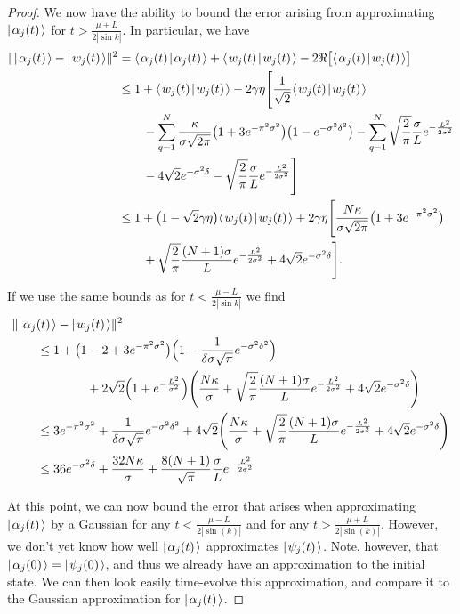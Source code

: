 \documentclass[../thesis-main/thesis-main]{subfiles}
\begin{document}
\begin{proof}
We now have the ability to bound the error arising from approximating $|\mspace{2mu} \alpha_j(t) \mspace{2mu} \rangle$ for $t > \frac{\mu + L}{2|\sin k|}$.  In particular, we have
\begin{align}
    \|{|\mspace{2mu} \alpha_j(t) \mspace{2mu} \rangle - |\mspace{2mu} w_j(t) \mspace{2mu} \rangle}\|^2 &= \langle\mspace{2mu} \alpha_j(t) \mspace{2mu} | \mspace{2mu} \alpha_j(t)\mspace{2mu} \rangle + \langle\mspace{2mu} w_j(t) \mspace{2mu} | \mspace{2mu} w_j(t)\mspace{2mu} \rangle - 2 \Re\big[ \langle\mspace{2mu} \alpha_j(t) \mspace{2mu} | \mspace{2mu} w_j(t)\mspace{2mu} \rangle \big]\\
  & \leq 1 + \langle\mspace{2mu} w_j(t) \mspace{2mu} | \mspace{2mu} w_j(t)\mspace{2mu} \rangle - 2\gamma \eta \Bigg[  \frac{1}{\sqrt{2}} \langle\mspace{2mu} w_j(t) \mspace{2mu} | \mspace{2mu} w_j(t)\mspace{2mu} \rangle \nonumber\\
  & \qquad  - \sum_{q=1}^N  \frac{\kappa}{\sigma \sqrt{2\pi}}\big(1 + 3 e^{-\pi^2 \sigma^2}\big)\big(1 - e^{-\sigma^2 \delta^2}\big) - \sum_{q=1}^N \sqrt{\frac{2}{\pi}} \frac{\sigma}{L} e^{-\frac{L^2}{2\sigma^2}}\nonumber\\
  &\qquad  - 4 \sqrt{2} e^{-\sigma^2 \delta} - \sqrt{\frac{2}{\pi}} \frac{\sigma}{L} e^{-\frac{L^2}{2\sigma^2}}\Bigg]\\
  &\leq 1 + \big(1 - \sqrt{2}\gamma \eta \big) \langle\mspace{2mu} w_j(t) \mspace{2mu} | \mspace{2mu} w_j(t)\mspace{2mu} \rangle + 2\gamma\eta \Bigg[ \frac{N \kappa}{\sigma \sqrt{2\pi}} \big(1 + 3 e^{-\pi^2 \sigma^2}\big) \nonumber\\
  &\qquad + \sqrt{\frac{2}{\pi}} \frac{(N+1)\sigma}{L} e^{ - \frac{L^2}{2\sigma^2}} + 4 \sqrt{2} e^{-\sigma^2\delta} \Bigg].
\end{align}
If we use the same bounds as for $t < \frac{\mu -L}{2|\sin k|}$ we find 
\begin{align}
  & \|{|\mspace{2mu} \alpha_j(t) \mspace{2mu} \rangle - |\mspace{2mu} w_j(t) \mspace{2mu} \rangle}\|^2 \\
  & \qquad \leq 1 + \big(1 - 2 + 3 e^{-\pi^2 \sigma^2}\big) \Big(1 - \frac{1}{\delta \sigma \sqrt{\pi}} e^{-\sigma^2 \delta^2} \Big) \nonumber\\
  &\qquad \qquad \qquad + 2\sqrt{2} \Big( 1 + e^{ - \frac{L^2}{\sigma^2}} \Big)\Bigg( \frac{N \kappa}{\sigma}  + \sqrt{\frac{2}{\pi}} \frac{(N+1)\sigma}{L} e^{-\frac{L^2}{2\sigma^2} }+ 4 \sqrt{2} e^{-\sigma^2 \delta}  \Bigg)\\
  & \qquad \leq 3 e^{-\pi^2 \sigma^2} + \frac{1}{\delta \sigma \sqrt{\pi}} e^{ - \sigma^2 \delta^2} + 4 \sqrt{2} \Bigg( \frac{N \kappa}{\sigma}  + \sqrt{\frac{2}{\pi}} \frac{(N+1)\sigma}{L} e^{-\frac{L^2}{2\sigma^2} }+ 4 \sqrt{2} e^{-\sigma^2 \delta}\Bigg) \\
  & \qquad \leq 36  e^{-\sigma^2 \delta} + \frac{32N\kappa}{\sigma} + \frac{8 (N+1)}{\sqrt{\pi}} \frac{\sigma}{L} e^{-\frac{L^2}{2\sigma^2}}
\end{align}


At this point, we can now bound the error that arises when approximating $|\mspace{2mu} \alpha_j(t) \mspace{2mu} \rangle$ by a Gaussian for any $t < \frac{\mu -L}{2 |\sin(k)|}$ and for any $t > \frac{\mu +L}{2|\sin(k)|}$.  However, we don't yet know how well $|\mspace{2mu} \alpha_j(t) \mspace{2mu} \rangle$ approximates $|\mspace{2mu} \psi_j(t) \mspace{2mu} \rangle$.  Note, however, that $|\mspace{2mu} \alpha_j(0) \mspace{2mu} \rangle = |\mspace{2mu} \psi_j(0) \mspace{2mu} \rangle$, and thus we already have an approximation to the initial state.  We can then look easily time-evolve this approximation, and compare it to the Gaussian approximation for $|\mspace{2mu} \alpha_j(t) \mspace{2mu} \rangle$. 


\end{proof}
\end{document}
